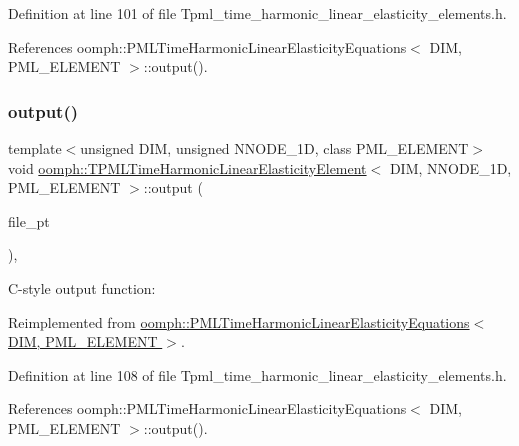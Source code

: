 Definition at line 101 of file Tpml\+\_\+time\+\_\+harmonic\+\_\+linear\+\_\+elasticity\+\_\+elements.\+h.



References oomph\+::\+P\+M\+L\+Time\+Harmonic\+Linear\+Elasticity\+Equations$<$ D\+I\+M, P\+M\+L\+\_\+\+E\+L\+E\+M\+E\+N\+T $>$\+::output().

\mbox{\label{classoomph_1_1TPMLTimeHarmonicLinearElasticityElement_ad6b5c28537ce21dd900d030da1df54ec}} 
\subsubsection{\texorpdfstring{output()}{output()}\hspace{0.1cm}{\footnotesize\ttfamily [3/4]}}
{\footnotesize\ttfamily template$<$unsigned D\+IM, unsigned N\+N\+O\+D\+E\+\_\+1D, class P\+M\+L\+\_\+\+E\+L\+E\+M\+E\+NT$>$ \\
void \hyperlink{classoomph_1_1TPMLTimeHarmonicLinearElasticityElement}{oomph\+::\+T\+P\+M\+L\+Time\+Harmonic\+Linear\+Elasticity\+Element}$<$ D\+IM, N\+N\+O\+D\+E\+\_\+1D, P\+M\+L\+\_\+\+E\+L\+E\+M\+E\+NT $>$\+::output (\begin{DoxyParamCaption}\item[{F\+I\+LE $\ast$}]{file\+\_\+pt }\end{DoxyParamCaption})\hspace{0.3cm}{\ttfamily [inline]}, {\ttfamily [virtual]}}



C-\/style output function\+: 



Reimplemented from \hyperlink{classoomph_1_1PMLTimeHarmonicLinearElasticityEquations_a4f333b308aa6bfd8e70a458574ed47fe}{oomph\+::\+P\+M\+L\+Time\+Harmonic\+Linear\+Elasticity\+Equations$<$ D\+I\+M, P\+M\+L\+\_\+\+E\+L\+E\+M\+E\+N\+T $>$}.



Definition at line 108 of file Tpml\+\_\+time\+\_\+harmonic\+\_\+linear\+\_\+elasticity\+\_\+elements.\+h.



References oomph\+::\+P\+M\+L\+Time\+Harmonic\+Linear\+Elasticity\+Equations$<$ D\+I\+M, P\+M\+L\+\_\+\+E\+L\+E\+M\+E\+N\+T $>$\+::output().

